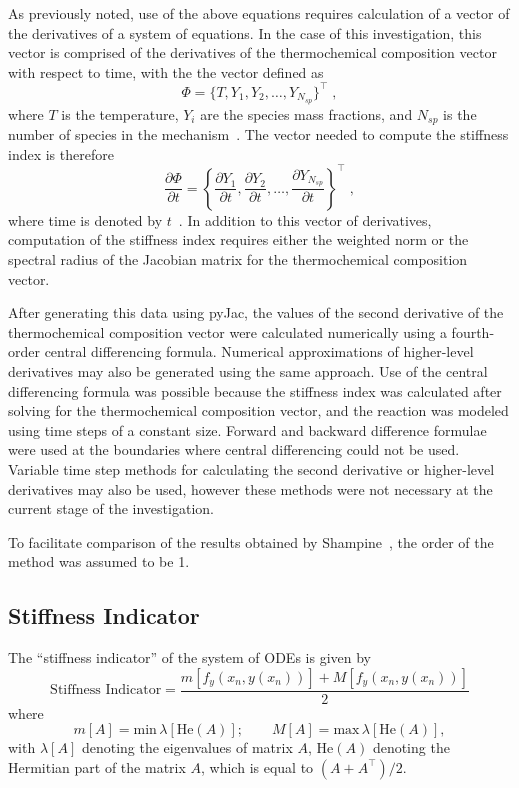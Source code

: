 \documentclass[12pt]{ussci}
\begin{document}
As previously noted, use of the above equations requires calculation of a vector of the derivatives of a system of equations.
In the case of this investigation, this vector is comprised of the derivatives of the thermochemical composition vector with respect to time, with the the vector defined as
\begin{equation}
    \Phi = \{T, Y_1, Y_2, \dots, Y_{N_{sp}} \}^\intercal \;,
\end{equation}
where $T$ is the temperature, $Y_i$ are the species mass fractions, and $N_{sp}$ is the number of species in the mechanism~\cite{Niemeyer:2017}.
The vector needed to compute the stiffness index is therefore
\begin{equation}
    \frac{\partial \Phi}{\partial t} = \left\{\frac{\partial Y_1}{\partial t}, \frac{\partial Y_2}{\partial t}, \dots, \frac{\partial Y_{N_{sp}}}{\partial t} \right\}^\intercal \;,
\end{equation}
where time is denoted by $t$~\cite{Niemeyer:2017}.
In addition to this vector of derivatives, computation of the stiffness index requires either the weighted norm or the spectral radius of the Jacobian matrix for the thermochemical composition vector.

After generating this data using pyJac, the values of the second derivative of the thermochemical composition vector were calculated numerically using a fourth-order central differencing formula.
Numerical approximations of higher-level derivatives may also be generated using the same approach.
Use of the central differencing formula was possible because the stiffness index was calculated after solving for the thermochemical composition vector, and the reaction was modeled using time steps of a constant size.
Forward and backward difference formulae were used at the boundaries where central differencing could not be used.
Variable time step methods for calculating the second derivative or higher-level derivatives may also be used, however these methods were not necessary at the current stage of the investigation.

To facilitate comparison of the results obtained by Shampine~\cite{Shampine1985}, the order of the method was assumed to be 1.

\subsection{Stiffness Indicator}
The ``stiffness indicator'' of the system of ODEs is given by
\begin{equation}
	\textrm{Stiffness Indicator} = \frac{m[f_y(x_n,y(x_n))] + M[f_y(x_n,y(x_n))]}{2}
\end{equation}
where
\begin{equation}
	m[A] = \textrm{min}\,\lambda[\textrm{He}(A)];\qquad M[A] = \textrm{max}\,\lambda[\textrm{He}(A)],
\end{equation}
with $\lambda [A]$ denoting the eigenvalues of matrix $A$, $\textrm{He}(A)$ denoting the Hermitian part of the matrix $A$, which is equal to $(A + A^\intercal ) / 2$.
\end{document}
